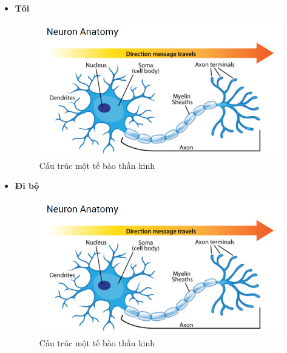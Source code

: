 \documentclass[12pt,a4paper,oneside]{book}
\numberwithin{equation}{chapter} %
\numberwithin{figure}{chapter} %
\numberwithin{table}{chapter} %
\begin{document}
\begin{itemize}
\item \textbf{Tôi}

\FloatBarrier
\begin{figure}[htp]
\begin{center}
\includegraphics[scale=0.8]{chap2/c2_figs/neuron.png}
\end{center}
\caption{Cấu trúc một tế bào thần kinh}
\label{fig:neuronsinhhoc}
\end{figure}
\FloatBarrier

\item \textbf{Đi bộ}
\FloatBarrier
\begin{figure}[htp]
\begin{center}
\includegraphics[scale=0.8]{chap2/c2_figs/neuron.png}
\end{center}
\caption{Cấu trúc một tế bào thần kinh}
\label{fig:neuronsinhhoc}
\end{figure}
\FloatBarrier


\end{itemize}
\end{document}
